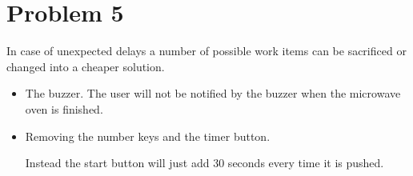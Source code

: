 \chapter{Problem 5}

In case of unexpected delays a number of possible work items can be sacrificed or changed into a cheaper solution.

\begin{itemize}

	\item The buzzer. The user will not be notified by the buzzer when the microwave oven is finished.
	


	\item Removing the number keys and the timer button. 
	
Instead the start button will just add 30 seconds every time it is pushed.

\end{itemize}


